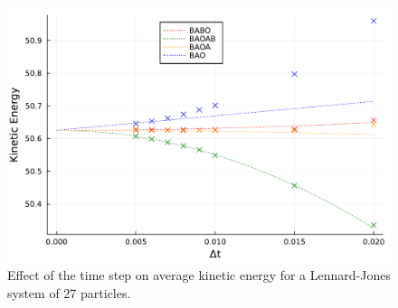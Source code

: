   \begin{figure}[htbp]
    \begin{center}
      \includegraphics[width=0.7\linewidth]{figures/chapter1/kinetic_energy_bias.pdf}
      \caption{ \label{fig:kinetic_energy_bias}
        Effect of the time step on average kinetic energy for a Lennard-Jones system of 27 particles.
      }
    \end{center}
  \end{figure}

